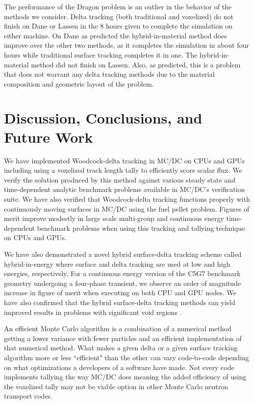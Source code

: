 The performance of the Dragon problem is an outlier in the behavior of the methods we consider.
Delta tracking (both traditional and voxelized) do not finish on Dane or Lassen in the 8 hours given to complete the simulation on either machine.
On Dane as predicted the hybrid-in-material method does improve over the other two methods, as it completes the simulation in about four hours while traditional surface tracking completes it in one.
The hybrid-in-material method did not finish on Lassen.
Also, as predicted, this is a problem that does not warrant any delta tracking methods due to the material composition and geometric layout of the problem.


\section{Discussion, Conclusions, and Future Work}
\label{disucssions}

We have implemented Woodcock-delta tracking in MC/DC on CPUs and GPUs including using a voxelized track length tally to efficiently score scalar flux.
We verify the solution produced by this method against various steady state and time-dependent analytic benchmark problems available in MC/DC's verification suite.
We have also verified that Woodcock-delta tracking functions properly with continuously moving surfaces in MC/DC using the fuel pellet problem.
Figures of merit improve modestly in large scale multi-group and continuous energy time-dependent benchmark problems when using this tracking and tallying technique on CPUs and GPUs.

We have also demonstrated a novel hybrid surface-delta tracking scheme called hybrid-in-energy where surface and delta tracking are used at low and high energies, respectively.
For a continuous energy version of the C5G7 benchmark geometry undergoing a four-phase transient, we observe an order of magnitude increase in figure of merit when executing on both CPU and GPU nodes.
We have also confirmed that the hybrid surface-delta tracking methods can yield improved results in problems with significant void regions \cite{leppanen_2010_burnup}.

An efficient Monte Carlo algorithm is a combination of a numerical method getting a lower variance with fewer particles and an efficient implementation of that numerical method.
What makes a given delta or a given surface tracking algorithm more or less ``efficient" than the other can vary code-to-code depending on what optimizations a developers of a software have made.
Not every code implements tallying the way MC/DC does meaning the added efficiency of using the voxelized tally may not be viable option in other Monte Carlo neutron transport codes.

